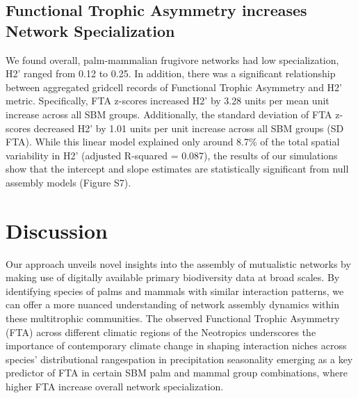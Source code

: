 \documentclass[
]{agujournal2019}
\begin{document}
\subsection{Functional Trophic Asymmetry increases Network
Specialization}\label{functional-trophic-asymmetry-increases-network-specialization}

We found overall, palm-mammalian frugivore networks had low
specialization, H2' ranged from 0.12 to 0.25. In addition, there was a
significant relationship between aggregated gridcell records of
Functional Trophic Asymmetry and H2' metric. Specifically, FTA z-scores
increased H2' by 3.28 units per mean unit increase across all SBM
groups. Additionally, the standard deviation of FTA z-scores decreased
H2' by 1.01 units per unit increase across all SBM groups (SD FTA).
While this linear model explained only around 8.7\% of the total spatial
variability in H2' (adjusted R-squared = 0.087), the results of our
simulations show that the intercept and slope estimates are
statistically significant from null assembly models (Figure S7).

\section{Discussion}\label{discussion}

Our approach unveils novel insights into the assembly of mutualistic
networks by making use of digitally available primary biodiversity data
at broad scales. By identifying species of palms and mammals with
similar interaction patterns, we can offer a more nuanced understanding
of network assembly dynamics within these multitrophic communities. The
observed Functional Trophic Asymmetry (FTA) across different climatic
regions of the Neotropics underscores the importance of contemporary
climate change in shaping interaction niches across species'
distributional rangespation in precipitation seasonality emerging as a
key predictor of FTA in certain SBM palm and mammal group combinations,
where higher FTA increase overall network specialization.
\end{document}
